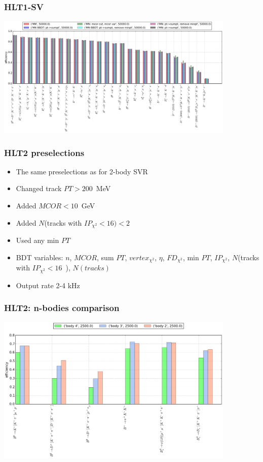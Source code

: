 \documentclass[xcolor=svgnames]{beamer}
\begin{document}
\begin{frame}\frametitle{HLT1-SV}
\includegraphics[width=4.5in]{images/hlt1-2body.png}
\end{frame}

\begin{frame}\frametitle{HLT2 preselections}
\small{
\begin{itemize}
	\item The same preselections as for 2-body SVR 
	\item Changed track $PT > 200$~MeV
	\item Added $MCOR < 10$~GeV
	\item Added $N$(tracks with $IP_{\chi^2}<16) < 2$
	\item Used any min $PT$
	\item BDT variables: $n$, $MCOR$, sum $PT$, $vertex_{\chi^2}$, $\eta$, $FD_{\chi^2}$, min $PT$, $IP_{\chi^2}$,  $N$(tracks with $IP_{\chi^2}<16$~), $N(tracks)$
	\item Output rate 2-4 kHz
\end{itemize}
}

\end{frame}

\begin{frame}\frametitle{HLT2: n-bodies comparison}
\includegraphics[width=4.5in]{images/bodies.png}
\end{frame}
\end{document}
